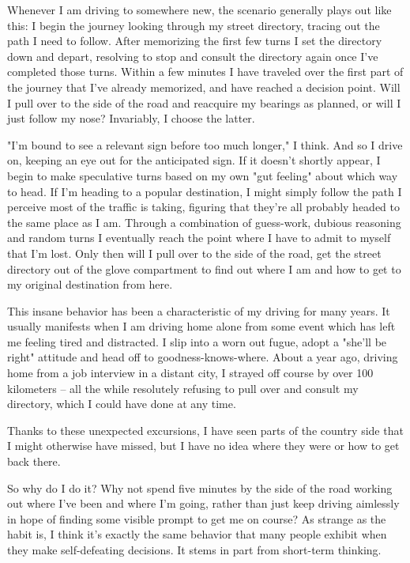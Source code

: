 \documentclass{article}
\begin{document}
Whenever I am driving to somewhere new, the scenario generally plays out
like this: I begin the journey looking through my street directory,
tracing out the path I need to follow. After memorizing the first few
turns I set the directory down and depart, resolving to stop and consult
the directory again once I've completed those turns. Within a few
minutes I have traveled over the first part of the journey that I've
already memorized, and have reached a decision point. Will I pull over
to the side of the road and reacquire my bearings as planned, or will I
just follow my nose? Invariably, I choose the latter.

"I'm bound to see a relevant sign before too much longer," I think. And
so I drive on, keeping an eye out for the anticipated sign. If it
doesn't shortly appear, I begin to make speculative turns based on my
own "gut feeling" about which way to head. If I'm heading to a popular
destination, I might simply follow the path I perceive most of the
traffic is taking, figuring that they're all probably headed to the same
place as I am. Through a combination of guess-work, dubious reasoning
and random turns I eventually reach the point where I have to admit to
myself that I'm lost. Only then will I pull over to the side of the
road, get the street directory out of the glove compartment to find out
where I am and how to get to my original destination from here.

This insane behavior has been a characteristic of my driving for many
years. It usually manifests when I am driving home alone from some event
which has left me feeling tired and distracted. I slip into a worn out
fugue, adopt a "she'll be right" attitude and head off to
goodness-knows-where. About a year ago, driving home from a job
interview in a distant city, I strayed off course by over 100 kilometers
-- all the while resolutely refusing to pull over and consult my
directory, which I could have done at any time.

Thanks to these unexpected excursions, I have seen parts of the country
side that I might otherwise have missed, but I have no idea where they
were or how to get back there.

So why do I do it? Why not spend five minutes by the side of the road
working out where I've been and where I'm going, rather than just keep
driving aimlessly in hope of finding some visible prompt to get me on
course? As strange as the habit is, I think it's exactly the same
behavior that many people exhibit when they make self-defeating
decisions. It stems in part from short-term thinking.
\end{document}
